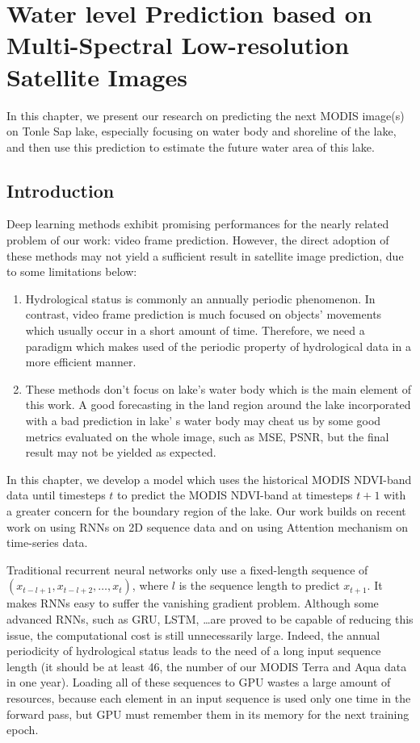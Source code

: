 \chapter{Water level Prediction based on Multi-Spectral Low-resolution Satellite Images }
\label{chap-4-predict-water-body}
\begin{ChapAbstract}
In this chapter, we present our research on predicting the next MODIS image(s) on Tonle Sap lake, especially focusing on water body and shoreline of the lake, and then use this prediction to estimate the future water area of this lake.
\end{ChapAbstract}

\section{Introduction}
Deep learning methods exhibit promising performances for the nearly related problem of our work: video frame prediction. However, the direct adoption of these methods may not yield a sufficient result in satellite image prediction, due to some limitations below:
\begin{enumerate} 
    \item Hydrological status is commonly an annually periodic phenomenon. In contrast, video frame prediction is much focused on objects' movements which usually occur in a short amount of time. Therefore, we need a paradigm which makes used of the periodic property of hydrological data in a more efficient manner.
    \item These methods don't focus on lake's water body which is the main element of this work. A good forecasting in the land region around the lake incorporated with a bad prediction in lake' s water body may cheat us by some good metrics evaluated on the whole image, such as MSE, PSNR, but the final result may not be yielded as expected.
\end{enumerate}
In this chapter, we develop a model which uses the historical MODIS NDVI-band data until timesteps $t$ to predict the MODIS NDVI-band at timesteps $t+1$ with a greater concern for the boundary region of the lake. Our work builds on recent work on using RNNs on 2D sequence data and on using Attention mechanism on time-series data.

Traditional recurrent neural networks only use a fixed-length sequence of \newline
$(x_{t - l + 1}, x_{t - l + 2},\dots,x_{t})$, where $l$ is the sequence length to predict $x_{t + 1}$. It makes RNNs easy to suffer the vanishing gradient problem. Although some advanced RNNs, such as GRU, LSTM, \dots are proved to be capable of reducing this issue, the computational cost is still unnecessarily large. Indeed, the annual periodicity of hydrological status leads to the need of a long input sequence length (it should be at least 46, the number of our MODIS Terra and Aqua data in one year). Loading all of these sequences to GPU wastes a large amount of resources, because each element in an input sequence is used only one time in the forward pass, but GPU must remember them in its memory for the next training epoch.

